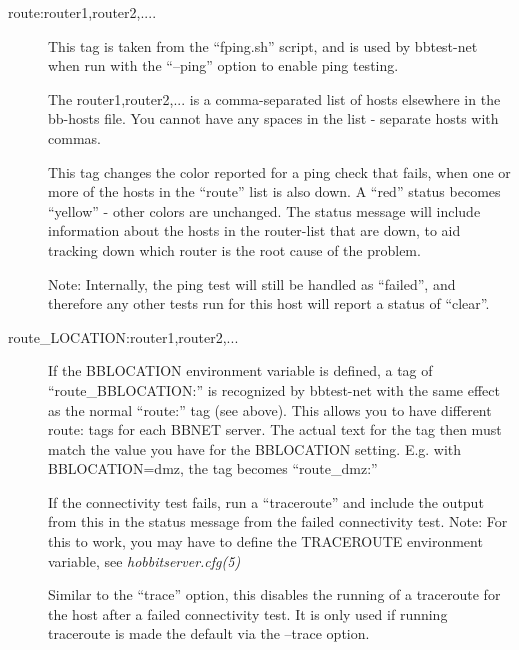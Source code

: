 \begin{description}
 

\item[route:router1,router2,....] This tag is taken from the ``fping.sh'' script, and is used by bbtest-net when run with the ``--ping'' option to enable ping testing. 

  The router1,router2,... is a comma-separated list of hosts elsewhere in the bb-hosts file. You cannot have any spaces in the list - separate hosts with commas. 


  This tag changes the color reported for a ping check that fails,
  when one or more of the hosts in the ``route'' list is also down. A
  ``red'' status becomes ``yellow'' - other colors are unchanged. The
  status message will include information about the hosts in the
  router-list that are down, to aid tracking down which router is the
  root cause of the problem. 



  Note: Internally, the ping test will still be handled as ``failed'',
  and therefore any other tests run for this host will report a status
  of ``clear''. 



 

\item[route\_LOCATION:router1,router2,...] If the BBLOCATION
  environment variable is defined, a tag of ``route\_BBLOCATION:'' is
  recognized by bbtest-net with the same effect as the normal
  ``route:'' tag (see above). This allows you to have different route:
  tags for each BBNET server. The actual text for the tag then must
  match the value you have for the BBLOCATION setting. E.g. with
  BBLOCATION=dmz, the tag becomes ``route\_dmz:'' 


 

\item[] If the connectivity test fails, run a ``traceroute'' and
  include the output from this in the status message from the failed
  connectivity test. Note: For this to work, you may have to define
  the TRACEROUTE environment variable, see \emph{hobbitserver.cfg(5)}



 

\item[] Similar to the ``trace'' option, this disables the
  running of a traceroute for the host after a failed connectivity
  test. It is only used if running traceroute is made the default via
  the --trace option. 


 


\end{description}

